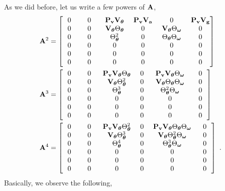 As we did before, let us write a few powers of ${\bf A}$,
%
%
\begin{align*}
\bfA^2 &= \begin{bmatrix}
  ~~0~~& ~~0~~& ~\bfP_\bfv \bfV_\bftheta~& \bfP_\bfv \bfV_\bfa&          0& \bfP_\bfv \bfV_\bfg\\
  0& 0& ~\bfV_\bftheta \Theta_\bftheta~&    0&      ~\bfV_\bftheta \Theta_\bfomega~&    0\\
  0& 0&  \Theta_\bftheta^2&     0& \Theta_\bftheta \Theta_\bfomega&     0\\
  0& 0&     0&     0&          0&     0\\
  0& 0&     0&     0&          0&     0\\
  0& 0&     0&     0&          0&     0
\end{bmatrix}\\
\bfA^3 &= \begin{bmatrix}
  ~~0~~& ~~0~~& \bfP_\bfv \bfV_\bftheta \Theta_\bftheta& ~0~&             ~\bfP_\bfv \bfV_\bftheta \Theta_\bfomega~& ~~0~~\\
  0& 0&  \bfV_\bftheta \Theta_\bftheta^2&    0&     \bfV_\bftheta \Theta_\bftheta \Theta_\bfomega&    0\\
  0& 0&     \Theta_\bftheta^3&     0& \Theta_\bftheta^2\Theta_\bfomega&     0\\
  0& 0&        0&     0&                    0&     0\\
  0& 0&        0&     0&                    0&     0\\
  0& 0&        0&     0&                    0&     0
\end{bmatrix}\\
\bfA^4 &= \begin{bmatrix}
  ~~0~~& ~~0~~& \bfP_\bfv \bfV_\bftheta \Theta_\bftheta^2 & ~0~&         \bfP_\bfv \bfV_\bftheta\Theta_\bftheta \Theta_\bfomega& ~~0~~\\
  0& 0&    \bfV_\bftheta \Theta_\bftheta^3&    0&  \bfV_\bftheta \Theta_\bftheta^2 \Theta_\bfomega&    0\\
  0& 0&       \Theta_\bftheta^4&     0& \Theta_\bftheta^3\Theta_\bfomega&     0\\
  0& 0&          0&     0&                              0&     0\\
  0& 0&          0&     0&                              0&     0\\
  0& 0&          0&     0&                              0&     0
\end{bmatrix}~.%
\end{align*}%
%
Basically, we observe the following,

